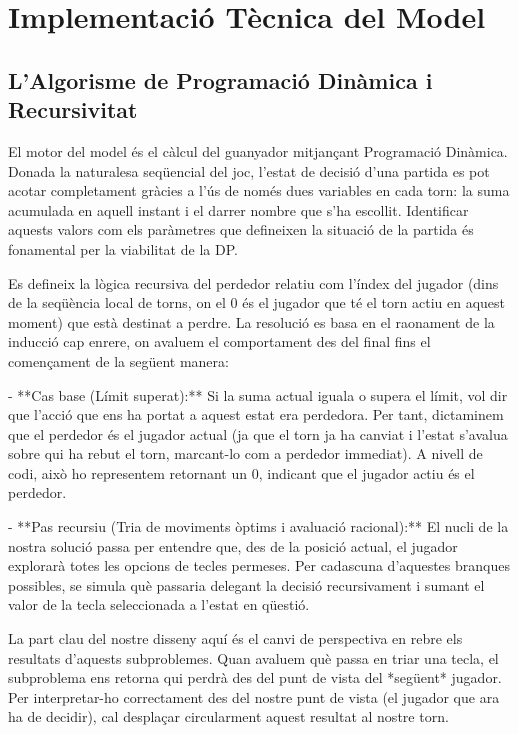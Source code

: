 \documentclass[compsoc, a4paper]{IEEEtran}
\begin{document}
\section{Implementació Tècnica del Model}

\subsection{L'Algorisme de Programació Dinàmica i Recursivitat}

El motor del model és el càlcul del guanyador mitjançant Programació Dinàmica. Donada la naturalesa seqüencial del joc, l'estat de decisió d'una partida es pot acotar completament gràcies a l'ús de només dues variables en cada torn: la suma acumulada en aquell instant i el darrer nombre que s'ha escollit. Identificar aquests valors com els paràmetres que defineixen la situació de la partida és fonamental per la viabilitat de la DP.

Es defineix la lògica recursiva del perdedor relatiu com l'índex del jugador (dins de la seqüència local de torns, on el 0 és el jugador que té el torn actiu en aquest moment) que està destinat a perdre. La resolució es basa en el raonament de la inducció cap enrere, on avaluem el comportament des del final fins el començament de la següent manera:

- **Cas base (Límit superat):** Si la suma actual iguala o supera el límit, vol dir que l'acció que ens ha portat a aquest estat era perdedora. Per tant, dictaminem que el perdedor és el jugador actual (ja que el torn ja ha canviat i l'estat s'avalua sobre qui ha rebut el torn, marcant-lo com a perdedor immediat). A nivell de codi, això ho representem retornant un 0, indicant que el jugador actiu és el perdedor.

- **Pas recursiu (Tria de moviments òptims i avaluació racional):** El nucli de la nostra solució passa per entendre que, des de la posició actual, el jugador explorarà totes les opcions de tecles permeses. Per cadascuna d'aquestes branques possibles, se simula què passaria delegant la decisió recursivament i sumant el valor de la tecla seleccionada a l'estat en qüestió.

  La part clau del nostre disseny aquí és el canvi de perspectiva en rebre els resultats d'aquests subproblemes. Quan avaluem què passa en triar una tecla, el subproblema ens retorna qui perdrà des del punt de vista del *següent* jugador. Per interpretar-ho correctament des del nostre punt de vista (el jugador que ara ha de decidir), cal desplaçar circularment aquest resultat al nostre torn.
  
\end{document}
